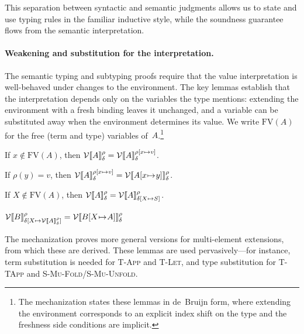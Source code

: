 \documentclass[acmsmall]{acmart}
\newcommand{\bind}{\mathchoice{\mathbin{\!\mapsto\!}}{\mathbin{\!\mapsto\!}}{\mapsto}{\mapsto}}
\begin{document}
This separation between syntactic and semantic judgments allows us to state and use typing rules in the familiar inductive style, while the soundness guarantee flows from the semantic interpretation.

\paragraph{Weakening and substitution for the interpretation.}
The semantic typing and subtyping proofs require that the value interpretation is well-behaved under changes to the environment. The key lemmas establish that the interpretation depends only on the variables the type mentions: extending the environment with a fresh binding leaves it unchanged, and a variable can be substituted away when the environment determines its value. We write $\mathrm{FV}(A)$ for the free (term and type) variables of~$A$.\footnote{The mechanization states these lemmas in de~Bruijn form, where extending the environment corresponds to an explicit index shift on the type and the freshness side conditions are implicit.}

\begin{lemma}\label{lem:interp-term-weaken}
  If\/ $x \notin \mathrm{FV}(A)$, then
  $\mathcal{V}\llbracket A \rrbracket_{\delta}^{\rho} = \mathcal{V}\llbracket A \rrbracket_{\delta}^{\rho[x \bind v]}$.
\end{lemma}

\begin{lemma}\label{lem:interp-term-subst}
  If\/ $\rho(y) = v$, then
  $\mathcal{V}\llbracket A \rrbracket_{\delta}^{\rho[x \bind v]} = \mathcal{V}\llbracket A[x \bind y] \rrbracket_{\delta}^{\rho}$.
\end{lemma}

\begin{lemma}\label{lem:interp-type-weaken}
  If\/ $X \notin \mathrm{FV}(A)$, then
  $\mathcal{V}\llbracket A \rrbracket_{\delta}^{\rho} = \mathcal{V}\llbracket A \rrbracket_{\delta[X \bind S]}^{\rho}$.
\end{lemma}

\begin{lemma}\label{lem:interp-type-subst}
  $\mathcal{V}\llbracket B \rrbracket_{\delta[X \bind \mathcal{V}\llbracket A \rrbracket_\delta^\rho]}^{\rho} = \mathcal{V}\llbracket B[X \bind A] \rrbracket_{\delta}^{\rho}$
\end{lemma}

\noindent The mechanization proves more general versions for multi-element extensions, from which these are derived. These lemmas are used pervasively---for instance, term substitution is needed for \textsc{T-App} and \textsc{T-Let}, and type substitution for \textsc{T-TApp} and \textsc{S-Mu-Fold}/\textsc{S-Mu-Unfold}.
\end{document}
